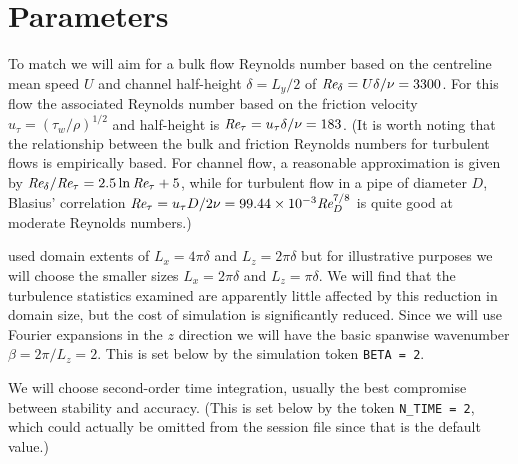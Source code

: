 \documentclass[11pt]{report}
\def\Rey{\mbox{\it Re}}                             %
\begin{document}

\section{Parameters}

To match \citet{kmm87} we will aim for a bulk flow Reynolds number
based on the centreline mean speed $U$ and channel half-height
$\delta=L_y/2$ of $\Rey_\delta=U\delta/\nu=3300$.  For this flow the
associated Reynolds number based on the friction velocity
$u_\tau=(\tau_w/\rho)^{1/2}$ and half-height is
$\Rey_\tau=u_\tau\delta/\nu=183$. (It is worth noting that the
relationship between the bulk and friction Reynolds numbers for
turbulent flows is empirically based. For channel flow, a reasonable
approximation is given by $\Rey_\delta/\Rey_\tau=2.5\ln\Rey_\tau+5$,
while for turbulent flow in a pipe of diameter $D$, Blasius'
correlation $\Rey_\tau=u_\tau D/2\nu=99.44\times10^{-3}\Rey_D^{7/8}$
is quite good at moderate Reynolds numbers.)

\citet{kmm87} used domain extents of $L_x=4\pi\delta$ and
$L_z=2\pi\delta$ but for illustrative purposes we will choose the
smaller sizes $L_x=2\pi\delta$ and $L_z=\pi\delta$. We will find that
the turbulence statistics examined are apparently little affected by
this reduction in domain size, but the cost of simulation is
significantly reduced.  Since we will use Fourier expansions in the
$z$ direction we will have the basic spanwise wavenumber
$\beta=2\pi/L_z=2$.  This is set below by the simulation token
\texttt{BETA = 2}.

We will choose second-order time integration, usually the best
compromise between stability and accuracy.  (This is set below by the
token \texttt{N\_TIME = 2}, which could actually be omitted from the
session file since that is the default value.)
\end{document}

